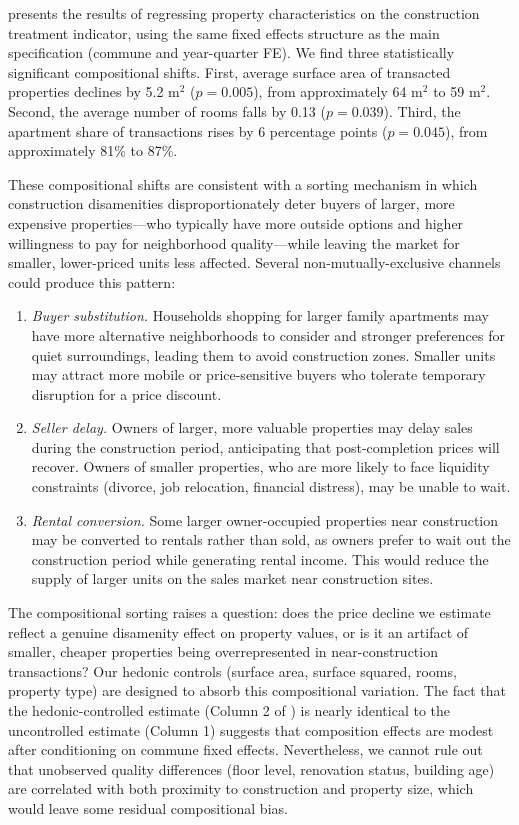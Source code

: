 \documentclass[12pt]{article}
\begin{document}
 presents the results of regressing property characteristics on the construction treatment indicator, using the same fixed effects structure as the main specification (commune and year-quarter FE). We find three statistically significant compositional shifts. First, average surface area of transacted properties declines by 5.2 m$^2$ ($p = 0.005$), from approximately 64 m$^2$ to 59 m$^2$. Second, the average number of rooms falls by 0.13 ($p = 0.039$). Third, the apartment share of transactions rises by 6 percentage points ($p = 0.045$), from approximately 81\% to 87\%.

These compositional shifts are consistent with a sorting mechanism in which construction disamenities disproportionately deter buyers of larger, more expensive properties---who typically have more outside options and higher willingness to pay for neighborhood quality---while leaving the market for smaller, lower-priced units less affected. Several non-mutually-exclusive channels could produce this pattern:

\begin{enumerate}
\item \textit{Buyer substitution.} Households shopping for larger family apartments may have more alternative neighborhoods to consider and stronger preferences for quiet surroundings, leading them to avoid construction zones. Smaller units may attract more mobile or price-sensitive buyers who tolerate temporary disruption for a price discount.

\item \textit{Seller delay.} Owners of larger, more valuable properties may delay sales during the construction period, anticipating that post-completion prices will recover. Owners of smaller properties, who are more likely to face liquidity constraints (divorce, job relocation, financial distress), may be unable to wait.

\item \textit{Rental conversion.} Some larger owner-occupied properties near construction may be converted to rentals rather than sold, as owners prefer to wait out the construction period while generating rental income. This would reduce the supply of larger units on the sales market near construction sites.
\end{enumerate}

The compositional sorting raises a question: does the price decline we estimate reflect a genuine disamenity effect on property values, or is it an artifact of smaller, cheaper properties being overrepresented in near-construction transactions? Our hedonic controls (surface area, surface squared, rooms, property type) are designed to absorb this compositional variation. The fact that the hedonic-controlled estimate (Column 2 of ) is nearly identical to the uncontrolled estimate (Column 1) suggests that composition effects are modest after conditioning on commune fixed effects. Nevertheless, we cannot rule out that unobserved quality differences (floor level, renovation status, building age) are correlated with both proximity to construction and property size, which would leave some residual compositional bias.
\end{document}
